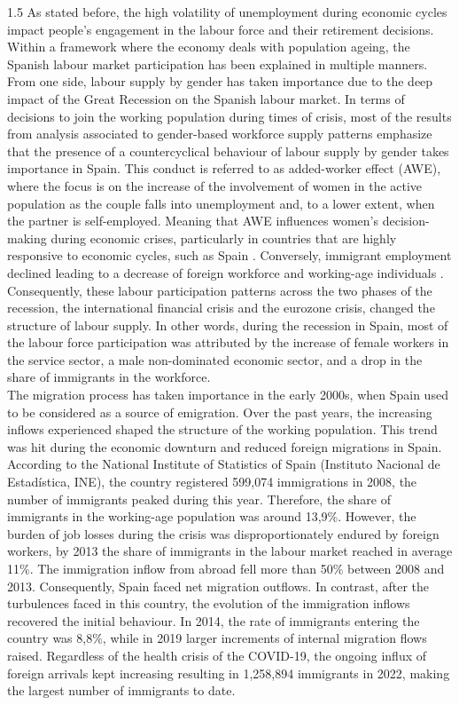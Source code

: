 \documentclass{article}
\begin{document}
\begin{spacing}{1.5}
 As stated before, the high volatility of unemployment during economic cycles impact people’s engagement in the labour force and their retirement decisions. Within a framework where the economy deals with population ageing, the Spanish labour market participation has been explained in multiple manners. From one side, labour supply by gender has taken importance due to the deep impact of the Great Recession on the Spanish labour market. In terms of decisions to join the working population during times of crisis, most of the results from analysis associated to gender-based workforce supply patterns emphasize that the presence of a countercyclical behaviour of labour supply by gender takes importance in Spain. This conduct is referred to as added-worker effect (AWE), where the focus is on the increase of the involvement of women in the active population as the couple falls into unemployment and, to a lower extent, when the partner is self-employed. Meaning that AWE influences women’s decision-making during economic crises, particularly in countries that are highly responsive to economic cycles, such as Spain \parencite{congregado2014unemployment,sanz2020labor}. Conversely, immigrant employment declined leading to a decrease of foreign workforce and working-age individuals \parencite{rodriguez2016labor}. Consequently, these labour participation patterns across the two phases of the recession, the international financial crisis and the eurozone crisis, changed the structure of labour supply. In other words, during the recession in Spain, most of the labour force participation was attributed by the increase of female workers in the service sector, a male non-dominated economic sector, and a drop in the share of immigrants in the workforce. \\

 The migration process has taken importance in the early 2000s, when Spain used to be considered as a source of emigration. Over the past years, the increasing inflows experienced shaped the structure of the working population. This trend was hit during the economic downturn and reduced foreign migrations in Spain.  According to the National Institute of Statistics of Spain (Instituto Nacional de Estadística, INE), the country registered 599,074 immigrations in 2008, the number of immigrants peaked during this year. Therefore, the share of immigrants in the working-age population was around 13,9\%. However, the burden of job losses during the crisis was disproportionately endured by foreign workers, by 2013 the share of immigrants in the labour market reached in average 11\%. The immigration inflow from abroad fell more than 50\% between 2008 and 2013. Consequently, Spain faced net migration outflows. In contrast, after the turbulences faced in this country, the evolution of the immigration inflows recovered the initial behaviour. In 2014, the rate of immigrants entering the country was 8,8\%, while in 2019 larger increments of internal migration flows raised. Regardless of the health crisis of the COVID-19, the ongoing influx of foreign arrivals kept increasing resulting in 1,258,894 immigrants in 2022, making the largest number of immigrants to date. 


\end{spacing}
\end{document}
